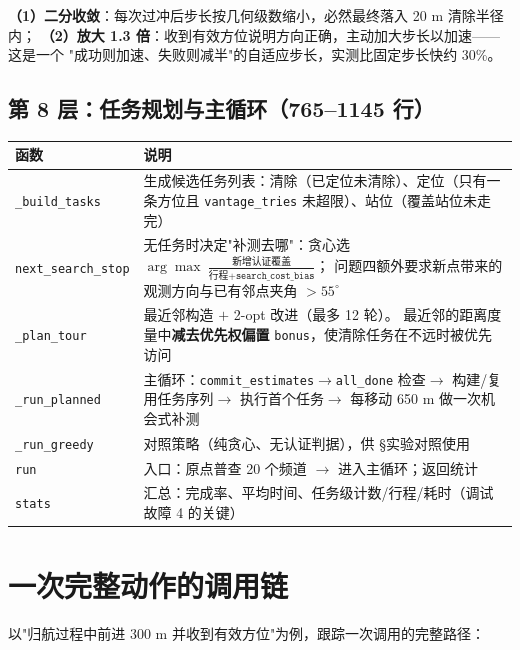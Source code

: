 \begin{keybox}[title=两个非平凡的设计]
\textbf{（1）二分收敛}：每次过冲后步长按几何级数缩小，必然最终落入 20 m 清除半径内；
\textbf{（2）放大 1.3 倍}：收到有效方位说明方向正确，主动加大步长以加速——这是一个
"成功则加速、失败则减半"的自适应步长，实测比固定步长快约 30\%。
\end{keybox}

\subsection{第 8 层：任务规划与主循环（765--1145 行）}

\begin{longtable}{p{4.8cm}p{9.8cm}}
\toprule
函数 & 说明 \\ \midrule
\endhead
\texttt{\_build\_tasks} & 生成候选任务列表：清除（已定位未清除）、定位（只有一条方位且
\texttt{vantage\_tries} 未超限）、站位（覆盖站位未走完） \\
\texttt{next\_search\_stop} & 无任务时决定"补测去哪"：贪心选
$\arg\max\ \frac{\text{新增认证覆盖}}{\text{行程}+\texttt{search\_cost\_bias}}$；
问题四额外要求新点带来的观测方向与已有邻点夹角 $>55^{\circ}$ \\
\texttt{\_plan\_tour} & 最近邻构造 $+$ 2-opt 改进（最多 12 轮）。
最近邻的距离度量中\textbf{减去优先权偏置} \texttt{bonus}，使清除任务在不远时被优先访问 \\
\texttt{\_run\_planned} & 主循环：\texttt{commit\_estimates}$\to$\texttt{all\_done} 检查$\to$
构建/复用任务序列$\to$ 执行首个任务$\to$ 每移动 650 m 做一次机会式补测 \\
\texttt{\_run\_greedy} & 对照策略（纯贪心、无认证判据），供 \S 实验对照使用 \\
\texttt{run} & 入口：原点普查 20 个频道 $\to$ 进入主循环；返回统计 \\
\texttt{stats} & 汇总：完成率、平均时间、任务级计数/行程/耗时（调试故障 4 的关键） \\
\bottomrule
\end{longtable}

\section{一次完整动作的调用链}

以"归航过程中前进 300 m 并收到有效方位"为例，跟踪一次调用的完整路径：

